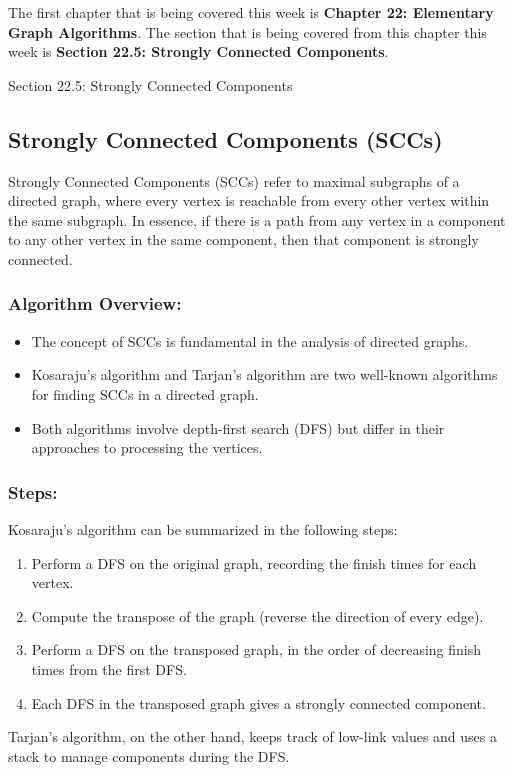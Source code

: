 The first chapter that is being covered this week is \textbf{Chapter 22: Elementary Graph Algorithms}. The section that is being covered from this chapter this week is \textbf{Section 22.5: Strongly Connected Components}.

\begin{notes}{Section 22.5: Strongly Connected Components}
    \subsection*{Strongly Connected Components (SCCs)}

    Strongly Connected Components (SCCs) refer to maximal subgraphs of a directed graph, where every vertex is reachable from every other vertex within the same subgraph. In essence, if there is a 
    path from any vertex in a component to any other vertex in the same component, then that component is strongly connected. \vspace*{1em}
    
    \subsubsection*{Algorithm Overview:}

    \begin{itemize}
        \item The concept of SCCs is fundamental in the analysis of directed graphs.
        \item Kosaraju's algorithm and Tarjan's algorithm are two well-known algorithms for finding SCCs in a directed graph.
        \item Both algorithms involve depth-first search (DFS) but differ in their approaches to processing the vertices.
    \end{itemize}
    
    \subsubsection*{Steps:}

    Kosaraju's algorithm can be summarized in the following steps:
    \begin{enumerate}
        \item Perform a DFS on the original graph, recording the finish times for each vertex.
        \item Compute the transpose of the graph (reverse the direction of every edge).
        \item Perform a DFS on the transposed graph, in the order of decreasing finish times from the first DFS.
        \item Each DFS in the transposed graph gives a strongly connected component.
    \end{enumerate}
    Tarjan's algorithm, on the other hand, keeps track of low-link values and uses a stack to manage components during the DFS.
    

\end{notes}
